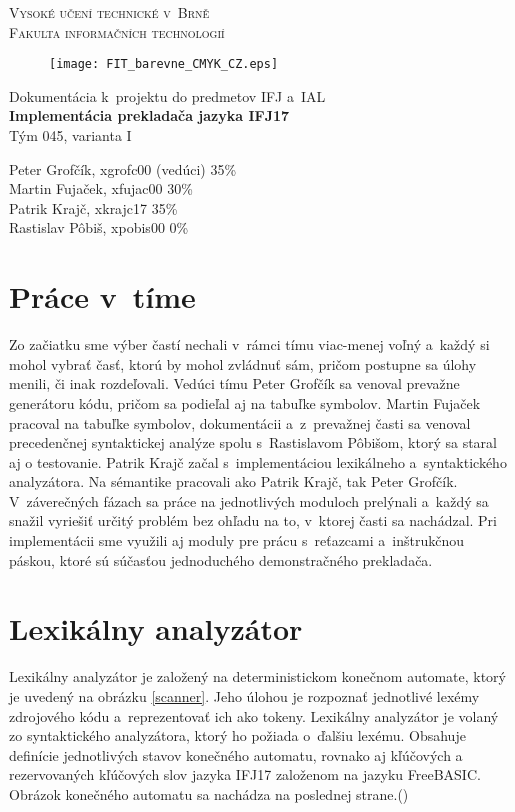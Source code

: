 \documentclass[14pt, a4paper]{extarticle}
\begin{document}
\begin{titlepage}
\begin{center}
\textsc{\LARGE Vysoké učení technické v~Brně \\ 
\Large Fakulta informačních technologií} \\
\begin{figure}[h]
\center
{
\texttt{[image: FIT\_barevne\_CMYK\_CZ.eps]}
}
\end{figure}
\Large{Dokumentácia k~projektu do predmetov IFJ a~IAL \\}
\Large{\textbf{Implementácia prekladača jazyka IFJ17} \\}
\medskip
\large{Tým 045, varianta I}
\end{center}
\vfill
\noindent 
\large{Peter Grofčík, xgrofc00 (vedúci) 35\% \\
Martin Fujaček, xfujac00 30\% \\
Patrik Krajč, xkrajc17 35\% \\
Rastislav Pôbiš, xpobis00 0\% \\}

\end{titlepage}

\tableofcontents
\clearpage

\section{Práce v~tíme}
 Zo začiatku sme výber častí nechali v~rámci tímu viac-menej voľný a~každý si mohol vybrať časť, ktorú by mohol zvládnuť sám, pričom postupne sa úlohy menili, či inak rozdeľovali. Vedúci tímu Peter Grofčík sa venoval prevažne generátoru kódu, pričom sa podieľal aj na tabuľke symbolov. Martin Fujaček pracoval na tabuľke symbolov, dokumentácii a~z~prevažnej časti sa venoval precedenčnej syntaktickej analýze spolu s~Rastislavom Pôbišom, ktorý sa staral aj o testovanie. Patrik Krajč začal s~implementáciou lexikálneho a~syntaktického analyzátora. Na sémantike pracovali ako Patrik Krajč, tak Peter Grofčík. V~záverečných fázach sa práce na jednotlivých moduloch prelýnali a~každý sa snažil vyriešiť určitý problém bez ohľadu na to, v~ktorej časti sa nachádzal. Pri implementácii sme využili aj moduly pre prácu s~reťazcami a~inštrukčnou páskou, ktoré sú súčasťou jednoduchého demonstračného prekladača.


\section{Lexikálny analyzátor}
Lexikálny analyzátor je založený na deterministickom konečnom automate, ktorý je uvedený na obrázku \ref{scanner}. Jeho úlohou je rozpoznať jednotlivé lexémy zdrojového kódu a~reprezentovať ich ako tokeny. Lexikálny analyzátor je volaný zo syntaktického analyzátora, ktorý ho požiada o~ďalšiu lexému. Obsahuje definície jednotlivých stavov konečného automatu, rovnako aj kľúčových a rezervovaných kľúčových slov jazyka IFJ17 založenom na jazyku FreeBASIC.
Obrázok konečného automatu sa nachádza na poslednej strane.(\pageref{scanner})
\end{document}
